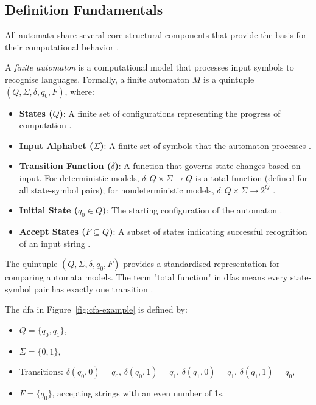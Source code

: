 \subsection{ Definition Fundamentals}
\label{subsec:automata-definition-fundamentals}

All automata share several core structural components that provide the basis for their computational behavior \cite{hopcroft2006introduction, sipser2013introduction}.

\begin{definition}
\label{def:finite-automaton}
A \textit{finite automaton} is a computational model that processes input symbols to recognise languages. Formally, a finite automaton $M$ is a quintuple $(Q, \Sigma, \delta, q_0, F)$, where:
\begin{itemize}
    \item \textbf{States ($Q$)}: A finite set of configurations representing the progress of computation \cite{sipser2013introduction}.
    \item \textbf{Input Alphabet ($\Sigma$)}: A finite set of symbols that the automaton processes \cite{hopcroft2006introduction, sudkamp2006languages}.
    \item \textbf{Transition Function ($\delta$)}: A function that governs state changes based on input. For deterministic models, $\delta: Q \times \Sigma \to Q$ is a total function (defined for all state-symbol pairs); for nondeterministic models, $\delta: Q \times \Sigma \to 2^Q$ \cite{sipser2013introduction}.
    \item \textbf{Initial State ($q_0 \in Q$)}: The starting configuration of the automaton \cite{hopcroft2006introduction}.
    \item \textbf{Accept States ($F \subseteq Q$)}: A subset of states indicating successful recognition of an input string \cite{sipser2013introduction}.
\end{itemize}
\end{definition}

\begin{remark}
The quintuple $(Q, \Sigma, \delta, q_0, F)$ provides a standardised representation for comparing automata models. The term "total function" in \glspl{dfa} means every state-symbol pair has exactly one transition \cite{sipser2013introduction}.
\end{remark}

\begin{example}
The \gls{dfa} in Figure~\ref{fig:cfa-example} is defined by:
\begin{itemize}
    \item $Q = \{q_0, q_1\}$,
    \item $\Sigma = \{0, 1\}$,
    \item Transitions: $\delta(q_0, 0) = q_0$, $\delta(q_0, 1) = q_1$, $\delta(q_1, 0) = q_1$, $\delta(q_1, 1) = q_0$,
    \item $F = \{q_0\}$, accepting strings with an even number of 1s.
\end{itemize}
\end{example}


